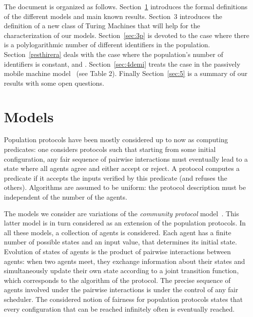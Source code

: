 \documentclass[UKenglish]{llncs}
\begin{document}
 

The document is organized as follows. Section~\ref{sec:2} introduces the formal definitions of the different
models and main known results. 
Section~3 introduces the definition of a new class of Turing Machines that will
help for the characterization of our models.
Section~\ref{sec:3p} is devoted to the case where there is
a polylogarithmic number of different identifiers in the population.
Section~\ref{resthirera} deals with the case where the population's number of identifiers is constant,
 and . 
Section~\ref{sec:4demi} treats the case  in the
passively mobile machine model~\cite{chatzigiannakis2011passively} (see Table 2).
Finally Section~\ref{sec:5} is  a summary of our results with some open questions. 
























\section{Models}
 \label{sec:2}

Population protocols have been mostly considered up to now as computing predicates:
one considers protocols such that starting from some initial
configuration, any fair sequence of pairwise interactions must
eventually lead to a state where all agents agree and either accept
or reject. A protocol computes a predicate if it accepts the inputs
verified by this predicate (and refuses the others).
Algorithms are assumed to be uniform: the protocol description must be 
independent of the number  of the agents.

The models we consider are variations of the {\em community
  protocol} model~\cite{guerraoui2009names}. This latter model is in
turn   considered as an extension of the population protocols.
In all these models, a collection of
agents is considered. Each agent has a
finite number of possible states and an input value, that
determines  its initial state. Evolution of states of agents is the
product of pairwise interactions between agents: when two agents meet,
they exchange information about their states and simultaneously update
their own state according to a joint transition function, which
corresponds to the algorithm of the protocol. The precise
sequence of agents involved under the pairwise interactions is 
under the control of any fair scheduler.
The considered
notion of fairness for population protocols states that every 
configuration that can be reached infinitely often is eventually
reached.
\end{document}
